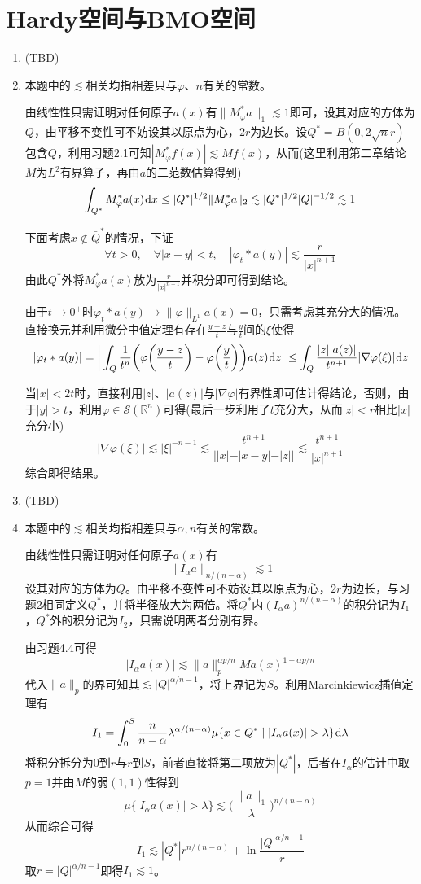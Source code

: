\documentclass[a4paper,UTF8,fontset=windows]{ctexart}
\newcommand*{\dr}{\hspace{0.07em}\mathrm{d}}
\begin{document}
\section{Hardy空间与BMO空间}
\begin{enumerate}
    \item (TBD)
    \item 本题中的$\lesssim$相关均指相差只与$\varphi$、$n$有关的常数。
    
    由线性性只需证明对任何原子$a(x)$有$\|M_\varphi^*a\|_1\lesssim1$即可，设其对应的方体为$Q$，由平移不变性可不妨设其以原点为心，$2r$为边长。设$Q^*=B(0,2\sqrt{n}r)$包含$Q$，利用习题2.1可知$|M_\varphi^*f(x)|\lesssim Mf(x)$，从而(这里利用第二章结论$M$为$L^2$有界算子，再由$a$的二范数估算得到)
    $$\int_{Q^*}M_\varphi^*a(x)\dr x\le|Q^*|^{1/2}\|M_\varphi^*a\|_2\lesssim|Q^*|^{1/2}|Q|^{-1/2}\lesssim1$$

    下面考虑$x\notin\bar{Q}^*$的情况，下证
    $$\forall t>0,\quad\forall|x-y|<t,\quad|\varphi_t*a(y)|\lesssim\frac{r}{|x|^{n+1}}$$
    由此$Q^*$外将$M_\varphi^*a(x)$放为$\frac{r}{|x|^{n+1}}$并积分即可得到结论。

    由于$t\to 0^+$时$\varphi_t*a(y)\to\|\varphi\|_{L^1}a(x)=0$，只需考虑其充分大的情况。直接换元并利用微分中值定理有存在$\frac{y-z}{t}$与$\frac{y}{t}$间的$\xi$使得
    $$|\varphi_t*a(y)|=\bigg|\int_Q\frac{1}{t^n}\bigg(\varphi\bigg(\frac{y-z}{t}\bigg)-\varphi\bigg(\frac{y}{t}\bigg)\bigg)a(z)\dr z\bigg|\le\int_Q\frac{|z||a(z)|}{t^{n+1}}|\nabla\varphi(\xi)|\dr z$$

    当$|x|<2t$时，直接利用$|z|$、$|a(z)|$与$|\nabla\varphi|$有界性即可估计得结论，否则，由于$|y|>t$，利用$\varphi\in\mathcal{S}(\mathbb{R}^n)$可得(最后一步利用了$t$充分大，从而$|z|<r$相比$|x|$充分小)
    $$|\nabla\varphi(\xi)|\lesssim|\xi|^{-n-1}\lesssim\frac{t^{n+1}}{||x|-|x-y|-|z||}\lesssim\frac{t^{n+1}}{|x|^{n+1}}$$
    综合即得结果。

    \item (TBD)
    \item 本题中的$\lesssim$相关均指相差只与$\alpha,n$有关的常数。
    
    由线性性只需证明对任何原子$a(x)$有
    $$\|I_\alpha a\|_{n/(n-\alpha)}\lesssim1$$
    设其对应的方体为$Q$。由平移不变性可不妨设其以原点为心，$2r$为边长，与习题2相同定义$Q^*$，并将半径放大为两倍。将$Q^*$内$(I_\alpha a)^{n/(n-\alpha)}$的积分记为$I_1$，$Q^*$外的积分记为$I_2$，只需说明两者分别有界。

    由习题4.4可得
    $$|I_\alpha a(x)|\lesssim\|a\|_p^{\alpha p/n}Ma(x)^{1-\alpha p/n}$$
    代入$\|a\|_p$的界可知其$\lesssim |Q|^{\alpha/n-1}$，将上界记为$S$。利用Marcinkiewicz插值定理有
    $$I_1=\int_0^S\frac{n}{n-\alpha}\lambda^{\alpha/(n-\alpha)}\mu\{x\in Q^*\mid|I_\alpha a(x)|>\lambda\}\dr\lambda$$
    将积分拆分为0到$r$与$r$到$S$，前者直接将第二项放为$|Q^*|$，后者在$I_\alpha$的估计中取$p=1$并由$M$的弱$(1,1)$性得到
    $$\mu\{|I_\alpha a(x)|>\lambda\}\lesssim\bigg(\frac{\|a\|_1}{\lambda}\bigg)^{n/(n-\alpha)}$$
    从而综合可得
    $$I_1\lesssim|Q^*|r^{n/(n-\alpha)}+\ln\frac{|Q|^{\alpha/n-1}}{r}$$
    取$r=|Q|^{\alpha/n-1}$即得$I_1\lesssim1$。


\end{enumerate}
\end{document}
